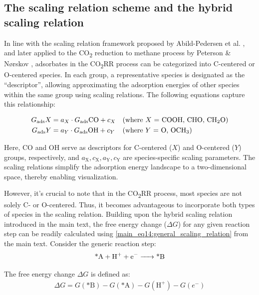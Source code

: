 \subsection{The scaling relation scheme and the hybrid scaling relation}
\label{supp_sec2.5_scaling}

In line with the scaling relation framework proposed by Abild-Pedersen et al. \cite{abild2007scaling},
and later applied to the CO\textsubscript{2} reduction to methane process by Peterson \& Nørskov \cite{peterson2012activity},
adsorbates in the CO\textsubscript{2}RR process can be categorized into C-centered or O-centered species.
In each group, a representative species is designated as the ``descriptor'', allowing approximating the adsorption energies of other species within the same group using scaling relations.
The following equations capture this relationship:

\begin{align}
  G_{\text{ads}}X &= a_X \cdot G_{\text{ads}}{\text{CO}} + c_X
  && \text{(where  $X$ = COOH, CHO, CH\textsubscript{2}O)}  \label{supp_eq1:scaling_relation_x_co}  \\
  G_{\text{ads}}Y &= a_Y \cdot G_{\text{ads}}{\text{OH}} + c_Y
  && \text{(where  $Y$ = O, OCH\textsubscript{3})}          \label{supp_eq2:scaling_relation_y_oh}
\end{align}

Here, CO and OH serve as descriptors for C-centered ($X$) and O-centered ($Y$) groups, respectively, and $a_{\mathrm{X}}, c_{\mathrm{X}}, a_{\mathrm{Y}}, c_{\mathrm{Y}}$ are species-specific scaling parameters.
The scaling relations simplify the adsorption energy landscape to a two-dimensional space, thereby enabling visualization.

However, it's crucial to note that in the CO\textsubscript{2}RR process, most species are not solely C- or O-centered.
Thus, it becomes advantageous to incorporate both types of species in the scaling relation.
Building upon the hybrid scaling relation introduced in the main text, the free energy change ($\Delta\mathit{G}$) for any given reaction step can be readily calculated using \cref{main_eq14:general_scaling_relation} from the main text.
Consider the generic reaction step:
\begin{align}
  \ce{\text{*}A + H+ + e- -> \text{*}B}  \label{supp_eq3:generic_reaction}
\end{align}

The free energy change $\Delta\mathit{G}$ is defined as:
\begin{align}
  \Delta G = G(\text{*}\mathrm{B}) - G(\text{*}\mathrm{A}) - G(\mathrm{H}^+) - G(e^-)  \label{supp_eq4:free_energy_change}
\end{align}

